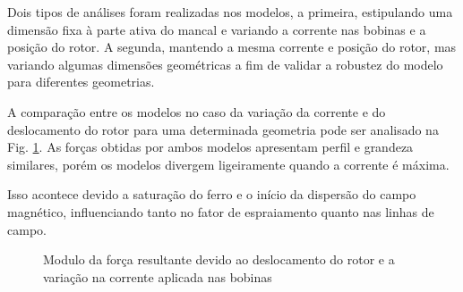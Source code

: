 Dois tipos de análises foram realizadas nos modelos, a primeira, estipulando uma dimensão fixa à parte ativa do mancal e variando a corrente nas bobinas e a posição do rotor. A segunda, mantendo a mesma corrente e posição do rotor, mas variando algumas dimensões geométricas a fim de validar a robustez do modelo para diferentes geometrias.

A comparação entre os modelos no caso da variação da corrente e do deslocamento do rotor para uma determinada geometria pode ser analisado na Fig. \ref{Fig:simulacoes:ativo:comparacao:dx:i}. As forças obtidas por ambos modelos apresentam perfil e grandeza similares, porém os modelos divergem ligeiramente quando a corrente é máxima.

Isso acontece devido a saturação do ferro e o início da dispersão do campo magnético, influenciando tanto no fator de espraiamento quanto nas linhas de campo. 

	\begin{figure}[!ht]
		
		\caption{Modulo da força resultante devido ao deslocamento do rotor e a variação na corrente aplicada nas bobinas}
		\label{Fig:simulacoes:ativo:comparacao:dx:i}
	\end{figure}

